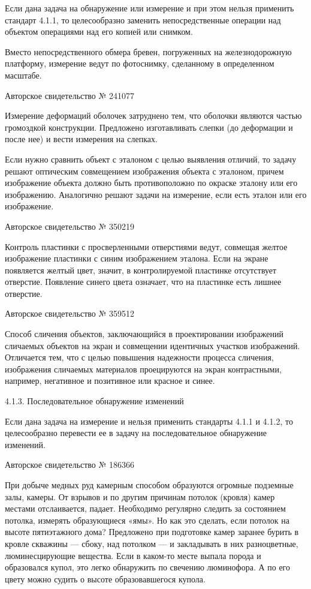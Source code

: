 Если  дана задача  на  обнаружение  или измерение  и  при этом  нельзя
применить стандарт  4.1.1, то целесообразно  заменить непосредственные
операции над объектом операциями над его копией или снимком.

Вместо непосредственного обмера бревен, погруженных на железнодорожную
платформу, измерение  ведут по  фотоснимку, сделанному  в определенном
масштабе.


Авторское свидетельство № 241077

Измерение деформаций  оболочек затруднено  тем, что  оболочки являются
частью  громоздкой конструкции.  Предложено  изготавливать слепки  (до
деформации и после нее) и вести измерения на слепках.

Если нужно  сравнить объект с  эталоном с целью выявления  отличий, то
задачу решают  оптическим совмещением изображения объекта  с эталоном,
причем  изображение  объекта  должно быть  противоположно  по  окраске
эталону или  его изображению.  Аналогично решают задачи  на измерение,
если есть эталон или его изображение.


Авторское свидетельство № 350219

Контроль пластинки с просверленными отверстиями ведут, совмещая желтое
изображение  пластинки с  синим изображением  эталона. Если  на экране
появляется желтый цвет, значит, в контролируемой пластинке отсутствует
отверстие.  Появление синего  цвета  означает, что  на пластинке  есть
лишнее отверстие.


Авторское свидетельство № 359512

Способ сличения  объектов, заключающийся в  проектировании изображений
сличаемых  объектов   на  экран   и  совмещении   идентичных  участков
изображений. Отличается тем, что с целью повышения надежности процесса
сличения,  изображения  сличаемых  материалов  проецируются  на  экран
контрастными, например, негативное и позитивное или красное и синее.


4.1.3. Последовательное обнаружение изменений

Если дана  задача на  измерение и нельзя  применить стандарты  4.1.1 и
4.1.2,  то целесообразно  перевести  ее в  задачу на  последовательное
обнаружение изменений.


Авторское свидетельство № 186366

При добыче медных руд  камерным способом образуются огромные подземные
залы,  камеры.  От  взрывов  и по  другим  причинам  потолок  (кровля)
камер местами  отслаивается, падает.  Необходимо регулярно  следить за
состоянием потолка,  измерять образующиеся «ямы». Но  как это сделать,
если потолок  на высоте  пятиэтажного дома? Предложено  при подготовке
камер  заранее бурить  в кровле  скважины —  сбоку, над  потолком —  и
закладывать  в  них  разноцветные, люминесцирующие  вещества.  Если  в
каком-то месте выпала порода и образовался купол, это легко обнаружить
по  свечению  люминофора.  А  по  его  цвету  можно  судить  о  высоте
образовавшегося купола.


